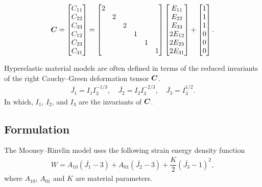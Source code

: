 \begin{gather}
    \bm{C}=\begin{bmatrix}
        C_{11} \\
        C_{22} \\
        C_{33} \\
        C_{12} \\
        C_{23} \\
        C_{31}
    \end{bmatrix}=\begin{bmatrix}
        2 &   &   &   &   &   \\
          & 2 &   &   &   &   \\
          &   & 2 &   &   &   \\
          &   &   & 1 &   &   \\
          &   &   &   & 1 &   \\
          &   &   &   &   & 1 \\
    \end{bmatrix}\begin{bmatrix}
        E_{11}  \\
        E_{22}  \\
        E_{33}  \\
        2E_{12} \\
        2E_{23} \\
        2E_{31}
    \end{bmatrix}+\begin{bmatrix}
        1 \\1\\1\\0\\0\\0
    \end{bmatrix}.
\end{gather}

Hyperelastic material models are often defined in terms of the reduced invariants of the right Cauchy--Green deformation tensor $\bm{C}$.
\begin{gather}
\bar{J_1}=I_1I_3^{-1/3},\quad
\bar{J_2}=I_2I_3^{-2/3},\quad
\bar{J_3}=I_3^{1/2}.
\end{gather}
In which, $I_1$, $I_2$, and $I_3$ are the invariants of $\bm{C}$.
\subsection{Formulation}
The Mooney--Rinvlin model uses the following strain energy density function
\begin{gather}
W=A_{10}\left(\bar{J_1}-3\right)+A_{01}\left(\bar{J_2}-3\right)+\dfrac{K}{2}\left(\bar{J_3}-1\right)^2,
\end{gather}
where $A_{10}$, $A_{01}$ and $K$ are material parameters.

